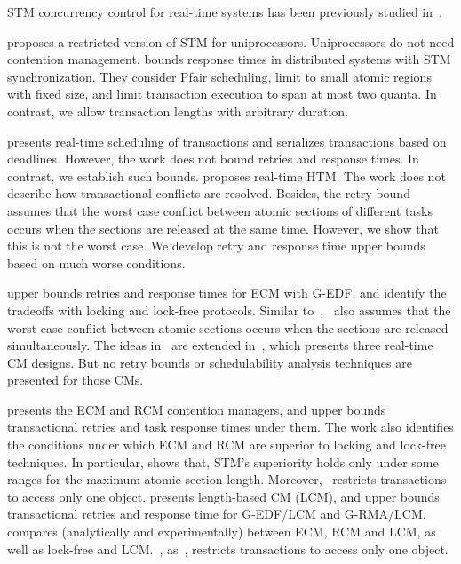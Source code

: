 \documentclass[prodmode,acmtecs]{acmsmall}
\begin{document}
STM concurrency control for real-time systems has been previously studied in~\cite{manson2006preemptible,fahmy2009bounding,sarni2009real,schoeberl2010rttm,key-1,barrosmanaging,stmconcurrencycontrol:emsoft11,lcmdac2012,shambake_phd_proposal}.


\cite{manson2006preemptible} proposes a restricted version of STM for uniprocessors. Uniprocessors do not need contention management. \cite{fahmy2009bounding} bounds response times in distributed  systems with STM synchronization. They consider Pfair scheduling, limit to small atomic regions with fixed size, and limit transaction execution to span at most two quanta. In contrast, we allow transaction lengths with  arbitrary duration. 

\cite{sarni2009real} presents real-time scheduling of transactions and serializes transactions based on deadlines. However, the work does not bound retries and response times. In contrast, we establish such bounds. \cite{schoeberl2010rttm} proposes real-time HTM. The work does not describe how transactional conflicts are resolved. Besides, the retry bound assumes that the worst case conflict between atomic sections of different tasks occurs when the sections are released at the same time. However, we show that this is not the worst case. We develop retry and response time upper bounds based on much worse conditions.


\cite{key-1} upper bounds retries and response times for  ECM with G-EDF, and identify the tradeoffs with locking and lock-free protocols. Similar to~\cite{schoeberl2010rttm},~\cite{key-1} also assumes that the worst case conflict between atomic sections occurs when the sections are released simultaneously. The ideas in~\cite{key-1} are extended in~\cite{barrosmanaging}, which presents three real-time CM designs. But no retry bounds or schedulability analysis techniques are presented for those CMs. 

\cite{stmconcurrencycontrol:emsoft11} presents the ECM and RCM contention managers, and upper bounds transactional retries and task response times under them. The work also identifies the conditions under which ECM and RCM are superior to locking and lock-free techniques. In particular, \cite{stmconcurrencycontrol:emsoft11} shows that, STM's superiority holds only under some ranges for the maximum atomic section length.  Moreover,~\cite{stmconcurrencycontrol:emsoft11} restricts transactions to access only one object.
\cite{lcmdac2012} presents length-based CM (LCM), and upper bounds transactional retries and response time for G-EDF/LCM and G-RMA/LCM.~\cite{lcmdac2012} compares (analytically and experimentally) between ECM, RCM and LCM, as well as lock-free and LCM.~\cite{lcmdac2012}, as~\cite{stmconcurrencycontrol:emsoft11}, restricts transactions to access only one object.
\end{document}
